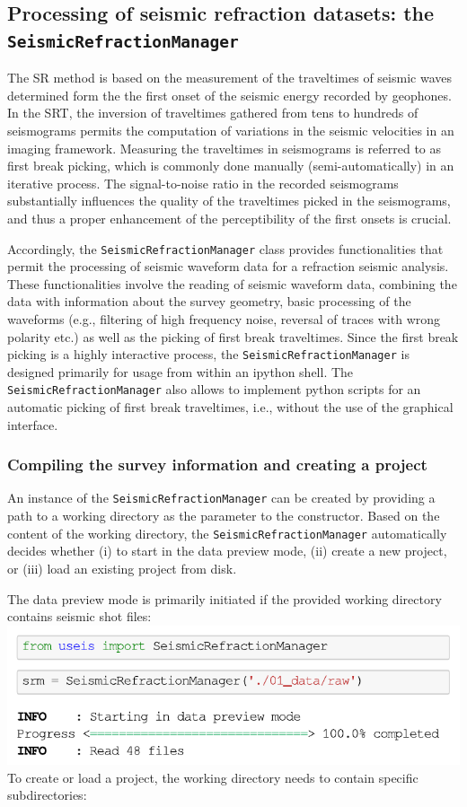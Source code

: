 \documentclass[a4paper,fleqn]{cas-sc}
\begin{document}
\subsection{Processing of seismic refraction datasets: the \texttt{SeismicRefractionManager}}

The SR method is based on the measurement of the traveltimes of seismic waves determined form the the first onset of the seismic energy recorded by geophones. In the SRT, the inversion of traveltimes gathered from tens to hundreds of seismograms permits the computation of variations in the seismic velocities in an imaging framework. Measuring the traveltimes in seismograms is referred to as first break picking, which is commonly done manually (semi-automatically) in an iterative process. The signal-to-noise ratio in the recorded seismograms substantially influences the quality of the traveltimes picked in the seismograms, and thus a proper enhancement of the perceptibility of the first onsets is crucial.

Accordingly, the \texttt{SeismicRefractionManager} class provides functionalities that permit the processing of seismic waveform data for a refraction seismic analysis. These functionalities involve the reading of seismic waveform data, combining the data with information about the survey geometry, basic processing of the waveforms (e.g., filtering of high frequency noise, reversal of traces with wrong polarity etc.) as well as the picking of first break traveltimes. Since the first break picking is a highly interactive process, the \texttt{SeismicRefractionManager} is designed primarily for usage from within an ipython shell. The \texttt{SeismicRefractionManager} also allows to implement python scripts for an automatic picking of first break traveltimes, i.e., without the use of the graphical interface.

\subsubsection{Compiling the survey information and creating a project}

An instance of the \texttt{SeismicRefractionManager} can be created by providing a path to a working directory as the parameter to the constructor. Based on the content of the working directory, the \texttt{SeismicRefractionManager} automatically decides whether (i) to start in the data preview mode, (ii) create a new project, or (iii) load an existing project from disk.

The data preview mode is primarily initiated if the provided working directory contains seismic shot files:
\newline
\includegraphics[width=.5\textwidth]{./figures/data_preview_mode.pdf}
\newline
To create or load a project, the working directory needs to contain specific subdirectories:
\end{document}
